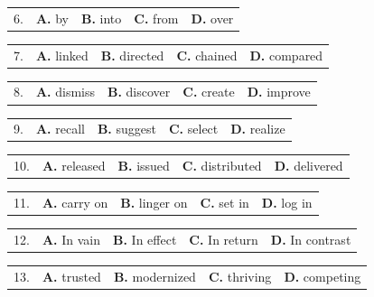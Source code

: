\documentclass[UTF8,11pt]{ctexart}
\begin{document}
\noindent\begin{tabularx}{\linewidth}{@{}lXXXX@{}}6. & \textbf{A.} by & \textbf{B.} into & \textbf{C.} from & \textbf{D.} over\\\end{tabularx}\par

\noindent\begin{tabularx}{\linewidth}{@{}lXXXX@{}}7. & \textbf{A.} linked & \textbf{B.} directed & \textbf{C.} chained & \textbf{D.} compared\\\end{tabularx}\par

\noindent\begin{tabularx}{\linewidth}{@{}lXXXX@{}}8. & \textbf{A.} dismiss & \textbf{B.} discover & \textbf{C.} create & \textbf{D.} improve\\\end{tabularx}\par

\noindent\begin{tabularx}{\linewidth}{@{}lXXXX@{}}9. & \textbf{A.} recall & \textbf{B.} suggest & \textbf{C.} select & \textbf{D.} realize\\\end{tabularx}\par

\noindent\begin{tabularx}{\linewidth}{@{}lXXXX@{}}10. & \textbf{A.} released & \textbf{B.} issued & \textbf{C.} distributed & \textbf{D.} delivered\\\end{tabularx}\par

\noindent\begin{tabularx}{\linewidth}{@{}lXXXX@{}}11. & \textbf{A.} carry on & \textbf{B.} linger on & \textbf{C.} set in & \textbf{D.} log in\\\end{tabularx}\par

\noindent\begin{tabularx}{\linewidth}{@{}lXXXX@{}}12. & \textbf{A.} In vain & \textbf{B.} In effect & \textbf{C.} In return & \textbf{D.} In contrast\\\end{tabularx}\par

\noindent\begin{tabularx}{\linewidth}{@{}lXXXX@{}}13. & \textbf{A.} trusted & \textbf{B.} modernized & \textbf{C.} thriving & \textbf{D.} competing\\\end{tabularx}\par
\end{document}
